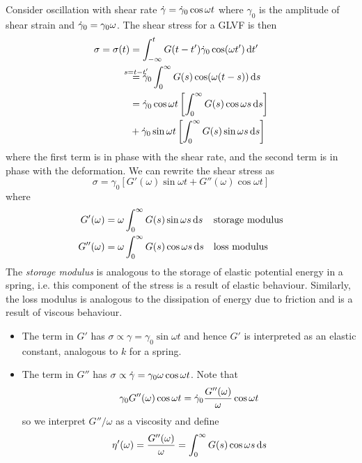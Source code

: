 \documentclass{jknotes}
\begin{document}
Consider oscillation with shear rate $\dot{\gamma} = \dot{\gamma}_0 \cos \omega t$ where
$\gamma_0$ is the amplitude of shear strain and $\dot{\gamma}_0 = \gamma_0 \omega$.
The shear stress for a GLVF is then
\begin{align}
	\sigma = \sigma(t) &= \int_{-\infty}^t G(t-t') \srate_0 \cos (\omega t' )\,
			\diffd t' \\
			&\stackrel{\mathmakebox[\widthof{=}]{s=t-t'}}{=}\srate_0 \int_0^\infty G(s) \cos
			(\omega(t-s)) \,
			\diffd s \\
			&= \srate_0 \cos \omega t \left[ \int_0^\infty G(s) \cos \omega s
		\, \diffd s \right] \\
		&+ \srate_0 \sin \omega t \left[ \int_0^\infty G(s) \sin \omega s
	\,\diffd s \right]
\end{align}
where the first term is in phase with the shear rate, and the second term is
in phase with the deformation. We can rewrite the shear stress as
\begin{equation}
	\sigma = \gamma_0 \left[ G'(\omega) \sin \omega t + G''(\omega) \cos
	\omega t \right]
\end{equation}
where
\begin{align}
	G'(\omega) &= \omega \int_0^\infty G(s) \sin \omega s \, \diffd s
						   &&\text{storage modulus} \\
	G''(\omega) &= \omega \int_0^\infty G(s) \cos \omega s \, \diffd s
							   &&\text{loss modulus}
\end{align}
The \emph{storage modulus} is analogous to the storage of elastic potential
energy in a spring, i.e. this component of the stress is a result of elastic
behaviour. Similarly, the loss modulus is analogous to the dissipation of
energy due to friction and is a result of viscous behaviour. 
\begin{itemize}
	\item The term in $G'$ has $\sigma \propto \gamma = \gamma_0 \sin \omega
		t$ and hence $G'$ is interpreted as an elastic constant, analogous to
		$k$ for a spring. 
	\item The term in $G''$ has $\sigma \propto \dot{\gamma} = \gamma_0 \omega \cos
		\omega t$. Note that
		\begin{equation}
			\gamma_0 G''(\omega) \cos \omega t = \dot{\gamma}_0
			\frac{G''(\omega)}{\omega} \cos \omega t
		\end{equation}
		so we interpret $G''/\omega$ as a viscosity and define 
		\begin{equation}
			\eta'(\omega) = \frac{G''(\omega)}{\omega} = \int_0^\infty G(s)
			\cos \omega s \, \diffd s
		\end{equation}
\end{itemize}
\end{document}
